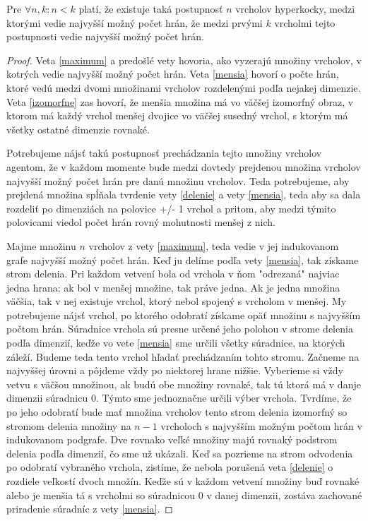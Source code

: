 \begin{veta}
Pre $\forall n, k: n < k$ platí, že existuje taká postupnosť $n$
vrcholov hyperkocky, medzi ktorými vedie najvyšší možný počet hrán, 
že medzi prvými $k$
vrcholmi tejto postupnosti vedie najvyšší možný počet hrán.
\end{veta}

\begin{proof}
Veta \ref{maximum} a predošlé vety hovoria, ako vyzerajú množiny vrcholov,
v kotrých vedie najvyšší možný počet hrán. Veta \ref{mensia} hovorí o počte
hrán, ktoré vedú medzi dvomi množinami vrcholov rozdelenými podľa nejakej
dimenzie. Veta \ref{izomorfne} zas hovorí, že menšia množina má vo väčšej
izomorfný obraz, v ktorom má každý vrchol menšej dvojice vo väčšej susedný 
vrchol, s ktorým má všetky ostatné dimenzie rovnaké.

Potrebujeme nájsť takú postupnosť prechádzania tejto množiny vrcholov
agentom, že
v každom momente bude medzi dovtedy prejdenou množina vrcholov najvyšší
možný počet hrán pre danú množinu vrcholov.
Teda potrebujeme, aby prejdená množina spĺňala tvrdenie vety \ref{delenie}
 a vety
\ref{mensia}, teda aby sa dala rozdeliť po dimenziách na polovice +/- 1
vrchol a pritom, aby medzi týmito polovicami viedol počet hrán rovný
mohutnosti menšej z nich.

Majme množinu $n$ vrcholov z vety \ref{maximum}, teda vedie v jej
indukovanom grafe najvyšší možný počet hrán. Keď ju delíme podľa vety
\ref{mensia}, tak získame strom delenia. Pri každom vetvení bola od vrchola
v ňom "odrezaná" najviac jedna hrana; ak bol v menšej množine, tak práve
jedna. Ak je jedna množina väčšia, tak v nej existuje vrchol, ktorý nebol
spojený s vrcholom v menšej. My potrebujeme nájsť vrchol, po ktorého
odobratí získame opäť množinu s najvyšším počtom hrán. Súradnice vrchola sú
presne určené jeho polohou v strome delenia podľa dimenzií, keďže vo vete
\ref{mensia} sme určili všetky súradnice, na ktorých záleží. Budeme teda
tento vrchol hľadať prechádzaním tohto stromu. Začneme na najvyššej úrovni a
pôjdeme vždy po niektorej hrane nižšie. Vyberieme si vždy vetvu s väčšou
množinou, ak budú obe množiny rovnaké, tak tú ktorá má v danje dimenzii
súradnicu 0. Týmto sme jednoznačne určili výber vrchola. Tvrdíme, že po jeho
odobratí bude mať množina vrcholov tento strom delenia izomorfný so stromom
delenia množiny na $n-1$ vrcholoch s najvyšším možným počtom hrán v
indukovanom podgrafe. Dve rovnako veľké množiny majú rovnaký podstrom
delenia podľa dimenzií, čo sme už ukázali. Keď sa pozrieme na strom
odvodenia po odobratí vybraného vrchola, zistíme, že nebola porušená veta
\ref{delenie} o rozdiele veľkostí dvoch množín. Keďže sú v každom vetvení
množiny buď rovnaké alebo je menšia tá s vrcholmi so súradnicou 0 v danej
dimenzii, zostáva zachované priradenie súradníc z vety \ref{mensia}.


\end{proof}
